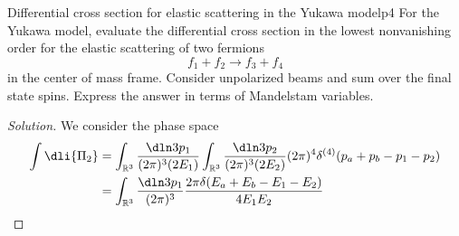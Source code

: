 \begin{problem}{Differential cross section for elastic scattering in the Yukawa model}{p4}
    For the Yukawa model, evaluate the differential cross section in the lowest nonvanishing order for the elastic scattering of two fermions
    \begin{equation*}
        f_1 + f_2 \to f_3 + f_4
    \end{equation*}
    in the center of mass frame. Consider unpolarized beams and sum over the final state spins. Express the answer in terms of Mandelstam variables.
\end{problem}
\begin{proof}[Solution]
    We consider the phase space
    \begin{align*}
        \int \dli{\Pi_2} &= \int_{\mathbb{R}^3}\frac{\dln3{p_1}}{(2\pi)^3 (2E_1)} \int_{\mathbb{R}^3} \frac{\dln3{p_2}}{(2\pi)^3 (2E_2)} (2\pi)^4 \delta^{(4)}(p_a + p_b - p_1 - p_2)\\
                         &= \int_{\mathbb{R}^3} \frac{\dln3{p_1}}{(2\pi)^3} \frac{2\pi \delta(E_a + E_b - E_1 - E_2)}{4 E_1 E_2}
    \end{align*}
\end{proof}
